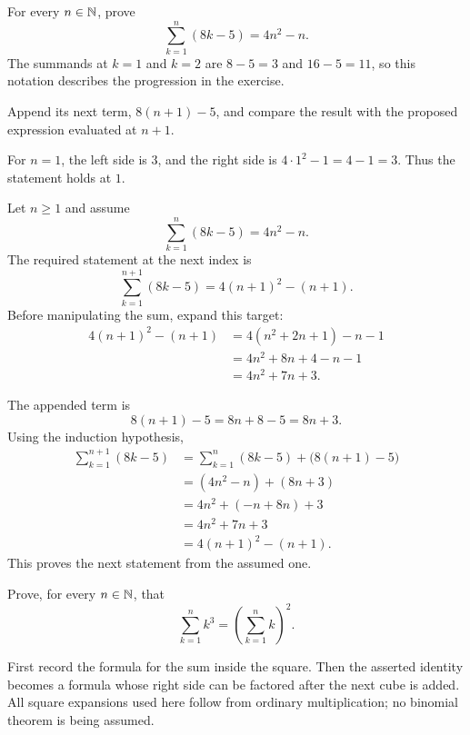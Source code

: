 

\goal For every $n\in\mathbb{N}$, prove
\[
 \sum_{k=1}^{n}(8k-5)=4n^2-n.
\]
The summands at $k=1$ and $k=2$ are $8-5=3$ and $16-5=11$, so this
notation describes the progression in the exercise.

\idea Append its next term, $8(n+1)-5$, and compare the result with
the proposed expression evaluated at $n+1$.

For $n=1$, the left side is $3$, and the right side is
$4\cdot1^2-1=4-1=3$. Thus the statement holds at $1$.

Let $n\geq1$ and assume
\[
 \sum_{k=1}^{n}(8k-5)=4n^2-n.
\]
The required statement at the next index is
\[
 \sum_{k=1}^{n+1}(8k-5)=4(n+1)^2-(n+1).
\]
Before manipulating the sum, expand this target:
\begin{align*}
 4(n+1)^2-(n+1)
 &=4(n^2+2n+1)-n-1\\
 &=4n^2+8n+4-n-1\\
 &=4n^2+7n+3.
\end{align*}

The appended term is
\[
 8(n+1)-5=8n+8-5=8n+3.
\]
Using the induction hypothesis,
\begin{align*}
 \sum_{k=1}^{n+1}(8k-5)
 &=\sum_{k=1}^{n}(8k-5)+\bigl(8(n+1)-5\bigr)\\
 &=(4n^2-n)+(8n+3)\\
 &=4n^2+(-n+8n)+3\\
 &=4n^2+7n+3\\
 &=4(n+1)^2-(n+1).
\end{align*}
This proves the next statement from the assumed one.



\goal Prove, for every $n\in\mathbb{N}$, that
\[
 \sum_{k=1}^{n}k^3=\left(\sum_{k=1}^{n}k\right)^2.
\]

\idea First record the formula for the sum inside the square. Then
the asserted identity becomes a formula whose right side can be factored
after the next cube is added. All square expansions used here follow from
ordinary multiplication; no binomial theorem is being assumed.

